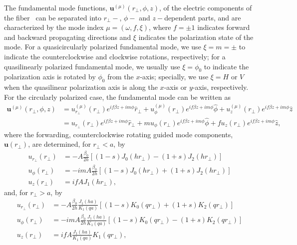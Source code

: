 \documentclass[preprint,aps,pra,onecolumn]{revtex4-1} %
\begin{document}
The fundamental mode functions, $\mathbf{u}^{(\mu)}(r\!_\perp,\phi,z)$, of the electric components of the fiber~\cite{LeKien2005,Lacroute2012} can be separated into $r\!_\perp-$, $\phi-$ and $z-$dependent parts, and are characterized by the mode index $\mu=(\omega,f,\xi)$, where $f=\pm 1$ indicates forward and backward propagating directions and $\xi $ indicates the polarization state of the mode. For a quasicircularly polarized fundamental mode, we use $\xi=m=\pm $ to indicate the counterclockwise and clockwise rotations, respectively; for a quasilinearly polarized fundamental mode, we usually use $\xi=\phi_0$ to indicate the polarization axis is rotated by $\phi_0$ from the $x$-axis; specially, we use $\xi=H$ or $V$ when the quasilinear polarization axis is along the $x$-axis or $y$-axis, respectively. For the circularly polarized case, the fundamental mode can be written as 
\begin{align}
\mathbf{u}^{(\mu)}(r\!_\perp,\phi,z) &=u^{(\mu)}_{r\!_\perp}(r\!_\perp) e^{if\beta z+im\phi }\hat{r}\!_\perp +u^{(\mu)}_{\phi}(r\!_\perp) e^{if\beta z+im\phi } \hat{\phi} +u^{(\mu)}_{z}(r\!_\perp)e^{if\beta z+im\phi }\hat{z}\\
&=u_{r\!_\perp}(r\!_\perp) e^{if\beta z+im\phi }\hat{r}\!_\perp + m u_{\phi}(r\!_\perp) e^{if\beta z+im\phi }\hat{\phi} + f u_z (r\!_\perp) e^{if\beta z+im\phi }\hat{z},
\end{align}
where the forwarding, counterclockwise rotating guided mode components, $\mathbf{u}(r\!_\perp)$, are determined, for $r\!_\perp<a$, by
\begin{subequations}
\label{urtcrla}
\begin{align}
u_{r\!_\perp}(r\!_\perp) &=-A\frac{\beta_0}{2h} \left[ (1-s)J_0(hr\!_\perp)-(1+s)J_2(hr\!_\perp) \right]\\
u_\phi(r\!_\perp) &=  -imA \frac{\beta_0}{2h} \left[ (1-s)J_0(hr\!_\perp) +(1+s)J_2(hr\!_\perp) \right] \\
u_z(r\!_\perp) &= ifA J_1(hr\!_\perp),
\end{align}
\end{subequations}
and, for $ r_\perp>a $, by
\begin{subequations}
\label{urtcrga}
\begin{align}
u_{r\!_\perp}(r\!_\perp) &=-A\frac{\beta_0}{2h}\frac{J_1(ha)}{K_1(qa)} \left[ (1-s)K_0(qr\!_\perp)+(1+s)K_2(qr\!_\perp) \right]\\
u_\phi(r\!_\perp) &=  -imA \frac{\beta_0}{2h} \frac{J_1(ha)}{K_1(qa)} \left[ (1-s)K_0(qr\!_\perp) - (1+s)K_2(qr\!_\perp) \right] \\
u_z(r\!_\perp) &= ifA \frac{J_1(ha)}{K_1(qa)} K_1(qr\!_\perp),
\end{align}
\end{subequations}
\end{document}
